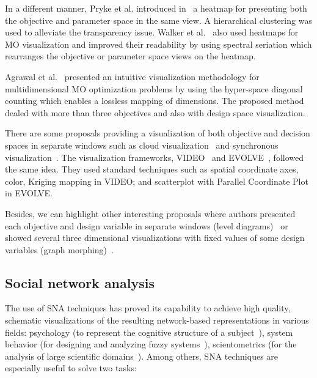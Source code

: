 \documentclass[journal]{IEEEtran}
\begin{document}
In a different manner, Pryke et al. introduced in~\cite{Pryke07} a heatmap for presenting both the objective and parameter space in the same view. A hierarchical clustering was used to alleviate the transparency issue. Walker et al.~\cite{Walker13} also used heatmaps for MO visualization and improved their readability by using spectral seriation which rearranges the objective or parameter space views on the heatmap. 


Agrawal et al.~\cite{Agrawal04,Agrawal06} presented an intuitive visualization methodology for multidimensional MO optimization problems by using the hyper-space diagonal counting which enables a lossless mapping of dimensions. The proposed method dealed with more than three objectives and also with design space visualization.



There are some proposals providing a visualization of both objective and decision spaces in separate windows such as cloud visualization~\cite{Eddy02} and synchronous visualization~\cite{Jeong07}. The visualization frameworks, VIDEO~\cite{Kollat07} and EVOLVE~\cite{Kubota14}, followed the same idea. They used standard techniques such as spatial coordinate axes, color, Kriging mapping in VIDEO; and scatterplot with Parallel Coordinate Plot in EVOLVE.





Besides, we can highlight other interesting proposals where authors presented each objective and design variable in separate windows (level diagrams)~\cite{Blasco08} or showed several three dimensional visualizations with fixed values of some design variables (graph morphing)~\cite{Winer02}.










\subsection{Social network analysis}
\label{sec:sna}

The use of SNA techniques has proved its capability to achieve high quality, schematic visualizations of the resulting network-based representations in various fields: psychology (to represent the cognitive structure of a subject~\cite{Dearholt90,Sch89}), system behavior (for designing and analyzing fuzzy systems~\cite{PanchoIEEETFS2013}), scientometrics (for the analysis of large scientific domains~\cite{Vargas2007visualizing}). Among others, SNA techniques are especially useful to solve two tasks:
\end{document}
